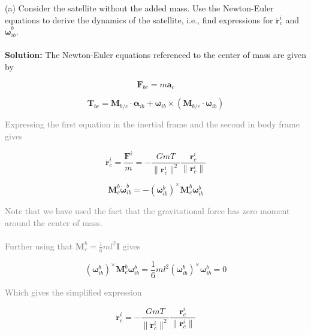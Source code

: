 (a) Consider the satellite without the added mass. Use the Newton-Euler equations to derive the dynamics of the satellite, i.e., find expressions for $\ddot{\mathbf{r}}_c^i$ and $\dot{\boldsymbol{\omega}}_{ib}^b$.
\\
\\

\textbf{Solution:} The Newton-Euler equations referenced to the center of mass are given by

\begin{equation}
    \mathbf{F}_{bc} = m \mathbf{a}_c
\end{equation}

\begin{equation}
    \mathbf{T}_{bc} = \mathbf{M}_{b/c} \cdot \boldsymbol{\alpha}_{ib} + \boldsymbol{\omega}_{ib} \times \left( \mathbf{M}_{b/c} \cdot \boldsymbol{\omega}_{ib} \right)
\end{equation}

\textcolor{gray}{Expressing the first equation in the inertial frame and the second in body frame gives}

\begin{equation}
    \ddot{\mathbf{r}}_c^i = \frac{\mathbf{F}^i}{m} = -\frac{G m T}{\|\mathbf{r}_c^i\|^2} \frac{\mathbf{r}_c^i}{\|\mathbf{r}_c^i\|}
\end{equation}

\begin{equation}
    \mathbf{M}_c^b \dot{\boldsymbol{\omega}}_{ib}^b = -\left( \boldsymbol{\omega}_{ib}^b \right)^\times \mathbf{M}_c^b \boldsymbol{\omega}_{ib}^b
\end{equation}

\textcolor{gray}{Note that we have used the fact that the gravitational force has zero moment around the center of mass.}
\\
\\
\textcolor{gray}{Further using that $\mathbf{M}_c^b = \frac{1}{6} m l^2 \mathbf{I}$ gives}

\begin{equation}
    \left( \boldsymbol{\omega}_{ib}^b \right)^\times \mathbf{M}_c^b \boldsymbol{\omega}_{ib}^b = \frac{1}{6} m l^2 \left( \boldsymbol{\omega}_{ib}^b \right)^\times \boldsymbol{\omega}_{ib}^b = 0
\end{equation}

\textcolor{gray}{Which gives the simplified expression}

\begin{equation}
    \ddot{\mathbf{r}}_c^i = -\frac{G m T}{\|\mathbf{r}_c^i\|^2} \frac{\mathbf{r}_c^i}{\|\mathbf{r}_c^i\|}
\end{equation}

